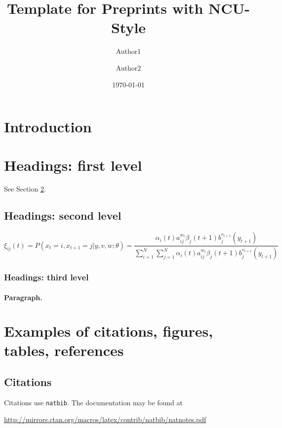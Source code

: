 \documentclass[table,dvipsnames]{ncu}   %
\title{Template for Preprints with NCU-Style}
\author[1]{Author1}
\author[2]{Author2}
\affiliation[1]{Affiliation}
\affiliation[2]{Affiliation}
\date{\today}
\theoremstyle{plain}
\theoremstyle{definition}
\theoremstyle{remark}
\begin{document}
\maketitle

\section{Introduction}
\lipsum[2]
\lipsum[3]

\section{Headings: first level}
\label{sec:headings}

\lipsum[4] See Section \ref{sec:headings}.

\subsection{Headings: second level}
\lipsum[5]
\begin{equation}
	\xi _{ij}(t)=P(x_{t}=i,x_{t+1}=j|y,v,w;\theta)= {\frac {\alpha _{i}(t)a^{w_t}_{ij}\beta _{j}(t+1)b^{v_{t+1}}_{j}(y_{t+1})}{\sum _{i=1}^{N} \sum _{j=1}^{N} \alpha _{i}(t)a^{w_t}_{ij}\beta _{j}(t+1)b^{v_{t+1}}_{j}(y_{t+1})}}
\end{equation}

\subsubsection{Headings: third level}
\lipsum[6]

\paragraph{Paragraph.}
\lipsum[7]

\section{Examples of citations, figures, tables, references}
\label{sec:others}

\subsection{Citations}
Citations use \verb+natbib+. The documentation may be found at
\begin{center}
	\url{http://mirrors.ctan.org/macros/latex/contrib/natbib/natnotes.pdf}
\end{center}
\end{document}
